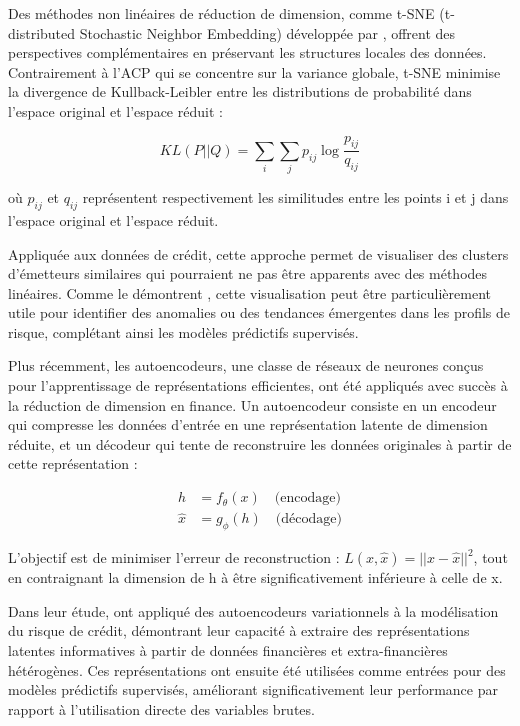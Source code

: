 Des méthodes non linéaires de réduction de dimension, comme t-SNE (t-distributed Stochastic Neighbor Embedding) développée par \citet{vandermaaten2008}, offrent des perspectives complémentaires en préservant les structures locales des données. Contrairement à l'ACP qui se concentre sur la variance globale, t-SNE minimise la divergence de Kullback-Leibler entre les distributions de probabilité dans l'espace original et l'espace réduit :

\begin{equation}
KL(P || Q) = \sum_i \sum_j p_{ij} \log \frac{p_{ij}}{q_{ij}}
\end{equation}

où $p_{ij}$ et $q_{ij}$ représentent respectivement les similitudes entre les points i et j dans l'espace original et l'espace réduit.

Appliquée aux données de crédit, cette approche permet de visualiser des clusters d'émetteurs similaires qui pourraient ne pas être apparents avec des méthodes linéaires. Comme le démontrent \citet{greco2019}, cette visualisation peut être particulièrement utile pour identifier des anomalies ou des tendances émergentes dans les profils de risque, complétant ainsi les modèles prédictifs supervisés.

Plus récemment, les autoencodeurs, une classe de réseaux de neurones conçus pour l'apprentissage de représentations efficientes, ont été appliqués avec succès à la réduction de dimension en finance. Un autoencodeur consiste en un encodeur qui compresse les données d'entrée en une représentation latente de dimension réduite, et un décodeur qui tente de reconstruire les données originales à partir de cette représentation :

\begin{align}
h &= f_{\theta}(x) \quad \text{(encodage)}\\
\hat{x} &= g_{\phi}(h) \quad \text{(décodage)}
\end{align}

L'objectif est de minimiser l'erreur de reconstruction : $L(x, \hat{x}) = ||x - \hat{x}||^2$, tout en contraignant la dimension de h à être significativement inférieure à celle de x.

Dans leur étude, \citet{petropoulos2019} ont appliqué des autoencodeurs variationnels à la modélisation du risque de crédit, démontrant leur capacité à extraire des représentations latentes informatives à partir de données financières et extra-financières hétérogènes. Ces représentations ont ensuite été utilisées comme entrées pour des modèles prédictifs supervisés, améliorant significativement leur performance par rapport à l'utilisation directe des variables brutes.